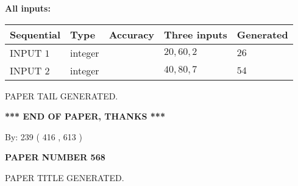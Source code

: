 \documentclass[12pt]{article}
\begin{document}
   
   
   
\noindent\vspace{0.1in}\hspace{-0.08in} {\textbf{\Large{All inputs: }}}
   
   
  
  
\noindent\begin{tabular}{|l|l|l|l|l|}
\hline
 Sequential & Type & Accuracy & Three inputs & Generated \\ 
\hline
 
 
  INPUT $  1 $ & integer &  & $
 20
 , 
 60
 , 
 2
 $ & $ 26 $ 
 \\  \hline  
 
 
  INPUT $  2 $ & integer &  & $
 40
 , 
 80
 , 
 7
 $ & $ 54 $ 
 \\  \hline  
 \end{tabular}
   
   
   
   
   
   
 \vspace{0.2in}
 
   
   
\vspace{2.0in} PAPER TAIL GENERATED.
   
   
   
   
\vspace{1.0in} 
{\textbf{\large{ *** END OF PAPER, THANKS *** }}} 
   
   
\hspace{1.0in} By: 
 239 ( 416 ,  613 )
   
   
   
   
\newpage 
\setcounter{page}{ 
   568001 } 
   
   
   
   
 {\textbf{ \Large{ PAPER NUMBER  568  }}}
   
   
\vspace{0.2in}
   
   
   
   
   
   
   
   
 \vspace{0.2in}
 
 
 
 
   
   
 PAPER TITLE GENERATED.
   
   
   
\vspace{0.2in}
   
\end{document}
